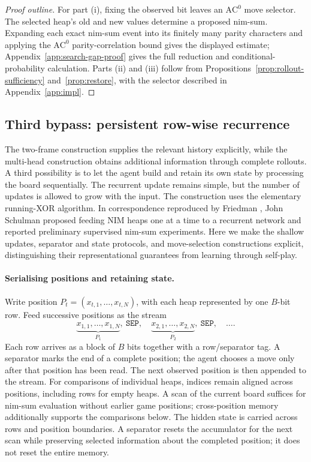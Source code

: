 \documentclass[11pt]{article}
\newcommand{\AC}{\mathrm{AC}}
\theoremstyle{plain}
\theoremstyle{definition}
\theoremstyle{remark}
\numberwithin{equation}{section}
\begin{document}
\begin{proof}[Proof outline]
For part (i), fixing the observed bit leaves an $\AC^0$ move selector. The selected heap's old and new values determine a proposed nim-sum. Expanding each exact nim-sum event into its finitely many parity characters and applying the $\AC^0$ parity-correlation bound gives the displayed estimate; Appendix~\ref{app:search-gap-proof} gives the full reduction and conditional-probability calculation. Parts (ii) and (iii) follow from Propositions~\ref{prop:rollout-sufficiency} and~\ref{prop:restore}, with the selector described in Appendix~\ref{app:impl}.
\end{proof}


\subsection{Third bypass: persistent row-wise recurrence}
\label{sec:recurrent-bypass}

The two-frame construction supplies the relevant history explicitly, while the multi-head construction obtains additional information through complete rollouts. A third possibility is to let the agent build and retain its own state by processing the board sequentially. The recurrent update remains simple, but the number of updates is allowed to grow with the input. The construction uses the elementary running-XOR algorithm. In correspondence reproduced by Friedman \cite{friedman2017deeplearning}, John Schulman proposed feeding NIM heaps one at a time to a recurrent network and reported preliminary supervised nim-sum experiments. Here we make the shallow updates, separator and state protocols, and move-selection constructions explicit, distinguishing their representational guarantees from learning through self-play.

\paragraph{Serialising positions and retaining state.}
Write position $P_t=(x_{t,1},\ldots,x_{t,N})$, with each heap represented by one $B$-bit row. Feed successive positions as the stream
\[
\underbrace{x_{1,1},\ldots,x_{1,N}}_{P_1},\ \mathtt{SEP},\quad
\underbrace{x_{2,1},\ldots,x_{2,N}}_{P_2},\ \mathtt{SEP},\quad\ldots .
\]
Each row arrives as a block of $B$ bits together with a row/separator tag. A separator marks the end of a complete position; the agent chooses a move only after that position has been read. The next observed position is then appended to the stream. For comparisons of individual heaps, indices remain aligned across positions, including rows for empty heaps.
A scan of the current board suffices for nim-sum evaluation without earlier game positions; cross-position memory additionally supports the comparisons below. The hidden state is carried across rows and position boundaries. A separator resets the accumulator for the next scan while preserving selected information about the completed position; it does not reset the entire memory.
\end{document}
